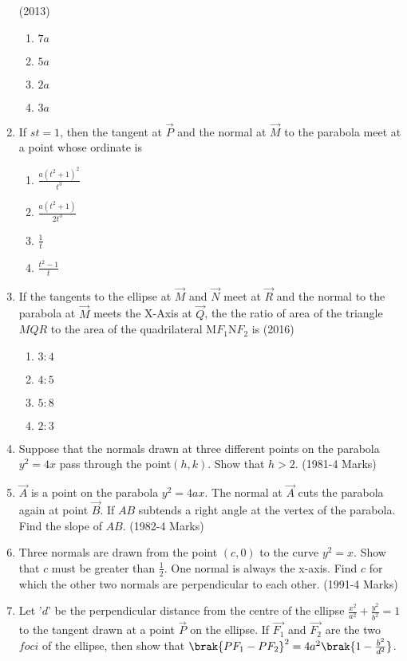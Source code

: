 \begin{enumerate}
\hfill(2013)        
\begin{multicols}{2}
\begin{enumerate}
    \item $7a$
    \item $5a$
    \item $2a$
    \item $3a$
\end{enumerate}
\end{multicols}
\item If $st=1$, then the tangent at $\Vec{P}$ and the normal at $\Vec{M}$ to the
parabola meet at a point whose ordinate is 
\begin{multicols}{2}
\begin{enumerate}
    \item $\frac{a(t^2+1)^2}{t^3}$
    \item $\frac{a(t^2+1)}{2t^3}$
    \item $\frac{1}{t}$
    \item $\frac{t^2-1}{t}$
    \end{enumerate}
\end{multicols}
\item If the tangents to the ellipse at $\Vec{M}$ and $\Vec{N}$ meet at $\Vec{R}$ and the normal to the parabola at $\Vec{M}$ meets the X-Axis at $\Vec{Q}$, the the ratio of area of the triangle $MQR$ to the area of the quadrilateral M$F_1$N$F_2$ is
\hfill(2016)
\begin{multicols}{2}
\begin{enumerate}
    \item $3:4$
    \item $4:5$
    \item $5:8$
    \item $2:3$
\end{enumerate}
\end{multicols}
    \item Suppose that the normals drawn at three different points on the parabola $y^2=4x$ pass through the point$(h,k)$. Show that $h>2$. 
		\hfill(1981-4 Marks)
		
	\item $\vec{A}$ is a point on the parabola $y^2=4ax$. The normal at $\vec{A}$ cuts the parabola again at point $\vec{B}$. If $AB$ subtends a right angle at the vertex of the parabola. Find the slope of $AB$.  
		\hfill(1982-4 Marks)
		
	\item Three normals are drawn from the point $(c,0)$ to the curve $y^2=x$. Show that $c$ must be greater than $\frac{1}{2}$. One normal is always the x-axis. Find $c$ for which the other two normals are perpendicular to each other. 
	      \hfill(1991-4 Marks)
\item Let '$d$' be the perpendicular distance from the centre of the ellipse $\frac{x^2}{a^2}+\frac{y^2}{b^2}=1$ to the tangent drawn at a point $\vec{P}$ on the ellipse. If $\vec{F_1}$ and $\vec{F_2}$ are the two $foci$ of the ellipse, then show that $\brak{PF_1-PF_2}^2=4a^2\brak{1-\frac{b^2}{d^2}}$. \hfill{}


\end{enumerate}
